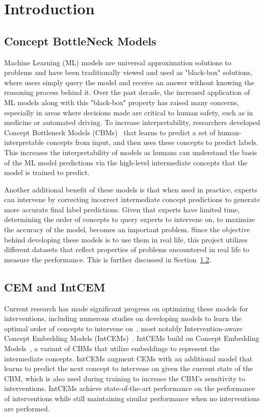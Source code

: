 \documentclass[../main.tex]{subfiles}
\begin{document}
\chapter{Introduction}
\label{firstcontentpage}

\section{Concept BottleNeck Models}
Machine Learning (ML) models are universal approximation solutions to problems
and have been traditionally viewed and used as "black-box" solutions, 
where users simply query the model and receive an answer without knowing the
 reasoning process behind it. Over the past decade,
the increased application of ML models along with this "black-box" property has
raised many concerns, especially in areas where decisions made are critical to
human safety, such as in medicine or automated driving. To increase
interpretability, researchers developed Concept Bottleneck Models (CBMs)~\cite{cbm} that 
learns to predict a set of human-interpretable concepts from input, and then uses these
concepts to predict labels. This increases the interpretability of models
as humans
can understand the basis of the ML model predictions via the high-level 
intermediate concepts that the model is trained to predict. 

Another additional benefit of these models is that when used in 
practice, experts can intervene by correcting incorrect intermediate
concept predictions to
generate more accurate final label predictions.
Given that experts have limited time, determining 
the order of concepts to query experts to intervene on, 
to maximize the accuracy of the model, 
becomes an important problem.
Since the objective behind developing these models is to
use them in real life, this project utilizes different
datasets that reflect properties of problems encountered in real life
to measure the performance. 
This is further discussed in Section~\ref{}.

\section{CEM and IntCEM}
Current research has made significant progress on optimizing these models for 
interventions,
including numerous studies on developing models to learn
the optimal order of concepts to intervene on~\cite{coop},
most notably Intervention-aware Concept Embedding Models (IntCEMs)~\cite{intcem}. 
IntCEMs build on
Concept Embedding Models~\cite{cem}, a variant of CBMs that utilize 
embeddings to represent the intermediate concepts. 
IntCEMs augment CEMs with an additional
model that learns to predict the next concept to intervene on given the current state
of the CBM, which is also used during training to increase the CBM's
sensitivity to interventions. IntCEMs achieve state-of-the-art performance on
the performance of interventions while still maintaining similar performance when
no interventions are performed.
\end{document}
